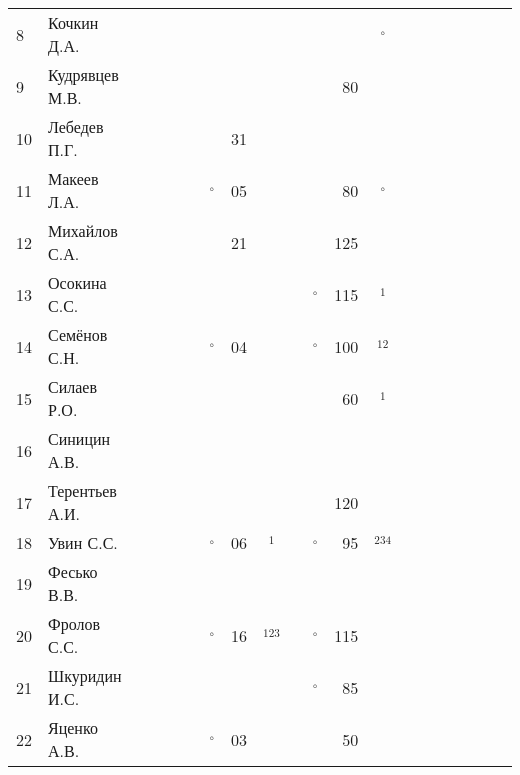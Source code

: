 \documentclass[a4paper,11pt]{article}
\newcommand*\OK{&\small \ding{51}$\!\!_\circ$} %
\newcommand*\Ok{&\small \ding{51}$\!\!_\circ$} %
\newcommand*\ok{&{\small \ding{51}}} %
\newcommand*\no{&{\small }} %
\newcommand*\da{&{\small\ding{48}$\!\!_1$}} %
\newcommand*\ab{&{\small\ding{48}$\!\!_{12}$}} %
\newcommand*\dabc{&{\small\ding{48}$\!\!_{123}$}} %
\newcommand*\bd{&{\small\ding{48}$\!\!_{234}$}} %
\begin{document}
\begin{tabular}{l|l|cccccccccrcccccccc}
 8&Кочкин Д.А.     \no\no\no\no\ok\ok\no  \ok\no \no\Ok\no&&&&&&\\
 9&Кудрявцев М.В.  \no\no\ok\ok\no\no\no  \ok\ok& 80\ok\ok&&&&&&\\
10&Лебедев П.Г.    \ok\ok\no\ok\ok&31\no  \ok\no \no\no\no&&&&&&\\
11&Макеев Л.А.     \ok\ok\ok\ok\OK&05\ok  \ok\ok& 80\Ok\ok&&&&&&\\
12&Михайлов С.А.   \no\no\ok\ok\ok&21\no  \ok\ok&125\ok\ok&&&&&&\\
13&Осокина С.С.    \ok\ok\ok\ok\no\no\ok  \ok\OK&115\da\no&&&&&&\\
14&Семёнов С.Н.    \ok\ok\ok\ok\OK&04\ok  \ok\OK&100\ab\ok&&&&&&\\
15&Силаев Р.О.     \ok\ok\no\no\no\no\no  \no\ok& 60\da\ok&&&&&&\\
16&Синицин А.В.    \ok\ok\no\ok\no\no\no  \no\no \no\no\no&&&&&&\\
17&Терентьев А.И.  \ok\ok\ok\ok\no\no\no  \no\ok&120\no\no&&&&&&\\
18&Увин С.С.       \ok\ok\ok\ok\OK&06\da  \ok\OK& 95\bd\ok&&&&&&\\
19&Фесько В.В.     \no\no\no\no\no\no\no  \no\no \no\no\no&&&&&&\\
20&Фролов С.С.     \ok\ok\ok\ok\OK&16\dabc\ok\OK&115\ok\ok&&&&&&\\ 
21&Шкуридин И.С.   \ok\ok\ok\ok\ok\no\ok  \ok\OK& 85\ok\ok&&&&&&\\
22&Яценко А.В.     \ok\ok\ok\ok\OK&03\ok  \ok\ok& 50\ok\ok&&&&&&\\ 
\bottomrule
\end{tabular} 
\newpage
\end{document}
